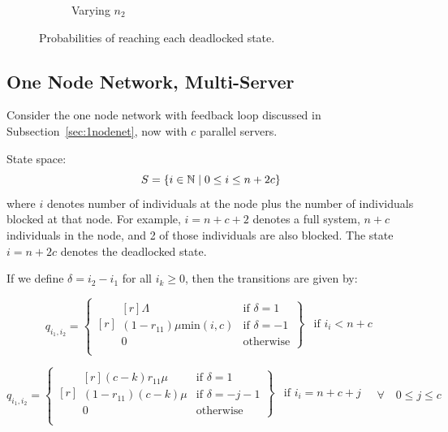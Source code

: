 \documentclass{article}
\begin{document}
\begin{figure}[H]
\begin{subfigure}[b]{0.5\textwidth}
  \caption{Varying $n_2$}
  \label{fig:absprobn2}
\end{subfigure}
\caption{Probabilities of reaching each deadlocked state.}
\label{fig:absorbingprobs}
\end{figure}


\subsection{One Node Network, Multi-Server}
Consider the one node network with feedback loop discussed in Subsection~\ref{sec:1nodenet}, now with $c$ parallel servers.

State space:
        \[S = \{i\in\mathbb{N} \nonscript\; | \nonscript\; 0 \leq i \leq n + 2c\}\]
where \(i\) denotes number of individuals at the node plus the number of individuals blocked at that node.
For example, $i=n+c+2$ denotes a full system, $n+c$ individuals in the node, and 2 of those individuals are also blocked.
The state $i=n+2c$ denotes the deadlocked state.

If we define $\delta = i_2 - i_1$ for all $i_k \geq 0$, then the transitions are given by:

\begin{equation}
  q_{i_1, i_2} = \left\{
  \begin{matrix*}[ r ]
    \left. \begin{matrix*}[ r ]
      \Lambda & \text{if } \delta = 1 \\
      (1-r_{11})\mu\text{min}(i, c) & \text{if } \delta = -1 \\
      0 & \text{otherwise}
    \end{matrix*} \right\} & \text{if } i_i < n + c \\
  \end{matrix*} \right.
\end{equation}

\begin{equation}
  q_{i_1, i_2} = \left\{
  \begin{matrix*}[ r ]
    \left. \begin{matrix*}[ r ]
      (c-k)r_{11}\mu & \text{if } \delta = 1 \\
      (1-r_{11})(c-k)\mu & \text{if } \delta = -j-1\\
      0 & \text{otherwise}
    \end{matrix*} \right\} & \text{if } i_i = n + c + j \\
  \end{matrix*} \right.
  \quad \forall \quad 0 \leq j \leq c
\end{equation}
\end{document}
